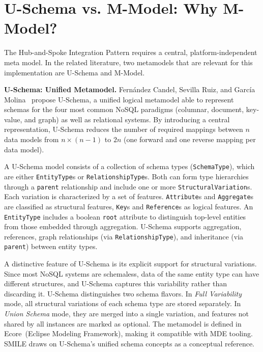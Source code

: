  \section{U-Schema vs. M-Model: Why M-Model?}
 \label{sec:metamodels}

The Hub-and-Spoke Integration Pattern requires a central, platform-independent meta model. In the related literature, two metamodels that are   relevant for this implementation are U-Schema and M-Model.


 \textbf{U-Schema: Unified Metamodel.}                                                                                                               Fernández Candel, Sevilla Ruiz, and García Molina~\cite{candel2022unified} propose U-Schema, a unified logical metamodel able to represent schemas for the four most common NoSQL paradigms (columnar, document, key-value, and graph) as well as relational systems. By introducing a central representation, U-Schema reduces the number of required mappings between $n$ data models from $n \times (n-1)$ to $2n$ (one forward and one reverse
mapping per data model).

A U-Schema model consists of a collection of schema types (\texttt{SchemaType}), which are either \texttt{EntityType}s or \texttt{RelationshipType}s. Both can form type hierarchies through a \texttt{parent} relationship and include one or more \texttt{StructuralVariation}s. Each variation is characterized by a set of features. \texttt{Attribute}s and \texttt{Aggregate}s are classified as structural features, \texttt{Key}s and \texttt{Reference}s as logical features.  An \texttt{EntityType} includes a boolean \texttt{root} attribute to distinguish top-level entities from those embedded through aggregation. U-Schema supports aggregation, references, graph relationships (via \texttt{RelationshipType}), and inheritance (via \texttt{parent}) between entity types.

A distinctive feature of U-Schema is its explicit support for structural variations. Since most NoSQL systems are schemaless, data of the same entity type can have different structures, and U-Schema captures this variability rather than discarding it. U-Schema distinguishes two schema flavors. In \emph{Full Variability} mode, all structural variations of each schema type are stored separately. In \emph{Union Schema} mode, they are merged into a single variation, and features not shared by all instances are marked as optional. The metamodel is defined in Ecore~(Eclipse Modeling Framework), making it compatible with MDE tooling. SMILE  draws on U-Schema's unified schema concepts as a conceptual reference.


